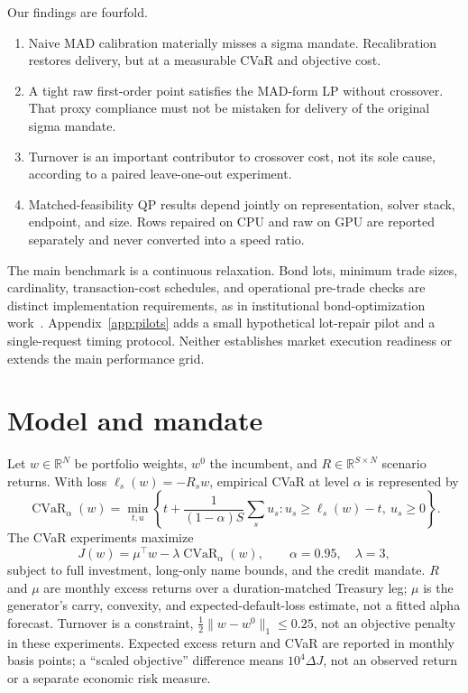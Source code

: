 \documentclass[11pt,a4paper]{article}
\begin{document}
Our findings are fourfold.
\begin{enumerate}
\item Naive MAD calibration materially misses a sigma mandate. Recalibration
      restores delivery, but at a measurable CVaR and objective cost.
\item A tight raw first-order point satisfies the MAD-form LP without
      crossover. That proxy compliance must not be mistaken for delivery of
      the original sigma mandate.
\item Turnover is an important contributor to crossover cost, not its sole
      cause, according to a paired leave-one-out experiment.
\item Matched-feasibility QP results depend jointly on representation, solver
      stack, endpoint, and size. Rows repaired on CPU and raw on GPU are
      reported separately and never converted into a speed ratio.
\end{enumerate}

The main benchmark is a continuous relaxation. Bond lots, minimum trade sizes,
cardinality, transaction-cost schedules, and operational pre-trade checks are
distinct implementation requirements, as in institutional bond-optimization
work~\citep{benslimane2023bondmip}. Appendix~\ref{app:pilots} adds a small
hypothetical lot-repair pilot and a single-request timing protocol. Neither
establishes market execution readiness or extends the main performance grid.

\section{Model and mandate}

Let $w\in\mathbb{R}^N$ be portfolio weights, $w^0$ the incumbent, and
$R\in\mathbb{R}^{S\times N}$ scenario returns. With loss
$\ell_s(w)=-R_s w$, empirical CVaR at level $\alpha$ is represented by
\begin{equation}
 \operatorname{CVaR}_{\alpha}(w)=
 \min_{t,u}\left\{t+\frac{1}{(1-\alpha)S}\sum_s u_s:
 u_s\geq \ell_s(w)-t,\ u_s\geq0\right\}.
\end{equation}
The CVaR experiments maximize
\begin{equation}
 J(w)=\mu^\top w-\lambda\operatorname{CVaR}_{\alpha}(w),
 \qquad \alpha=0.95,\quad\lambda=3,
\end{equation}
subject to full investment, long-only name bounds, and the credit mandate.
$R$ and $\mu$ are monthly excess returns over a duration-matched Treasury
leg; $\mu$ is the generator's carry, convexity, and expected-default-loss
estimate, not a fitted alpha forecast. Turnover is a constraint,
$\frac12\lVert w-w^0\rVert_1\leq0.25$, not an objective penalty in these
experiments. Expected excess return and CVaR are reported in monthly basis
points; a ``scaled objective'' difference means $10^4\Delta J$, not an
observed return or a separate economic risk measure.
\end{document}
